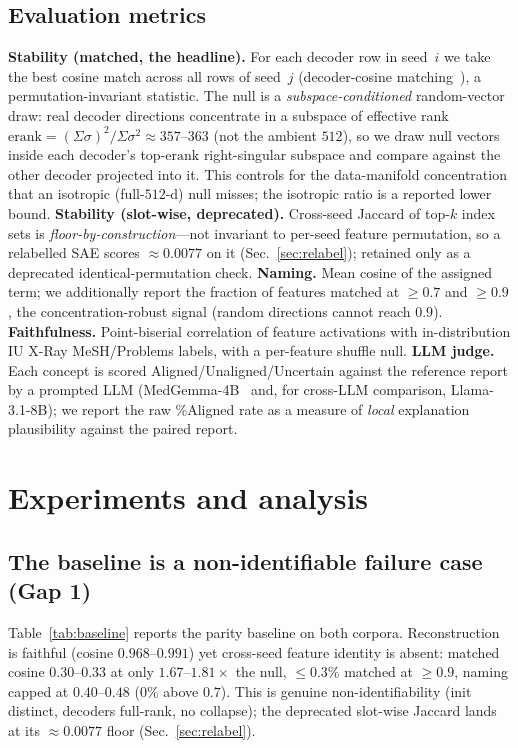 \documentclass[sigconf, nonacm]{acmart}
\begin{document}
\subsection{Evaluation metrics}
\textbf{Stability (matched, the headline).} For each decoder row in seed~$i$ we take the best cosine match across all rows of seed~$j$ (decoder-cosine matching~\cite{bricken2023monosemanticity,lan2024universality}), a permutation-invariant statistic. The null is a \emph{subspace-conditioned} random-vector draw: real decoder directions concentrate in a subspace of effective rank $\mathrm{erank}{=}(\Sigma\sigma)^2/\Sigma\sigma^2{\approx}357$--$363$ (not the ambient $512$), so we draw null vectors inside each decoder's top-$\mathrm{erank}$ right-singular subspace and compare against the other decoder projected into it. This controls for the data-manifold concentration that an isotropic (full-$512$-d) null misses; the isotropic ratio is a reported lower bound.
\textbf{Stability (slot-wise, deprecated).} Cross-seed Jaccard of top-$k$ index sets is \emph{floor-by-construction}---not invariant to per-seed feature permutation, so a relabelled SAE scores ${\approx}0.0077$ on it (Sec.~\ref{sec:relabel}); retained only as a deprecated identical-permutation check.
\textbf{Naming.} Mean cosine of the assigned term; we additionally report the fraction of features matched at $\geq0.7$ and $\geq0.9$, the concentration-robust signal (random directions cannot reach $0.9$).
\textbf{Faithfulness.} Point-biserial correlation of feature activations with in-distribution IU X-Ray MeSH/Problems labels, with a per-feature shuffle null. \textbf{LLM judge.} Each concept is scored Aligned/Unaligned/Uncertain against the reference report by a prompted LLM (MedGemma-4B~\cite{sellergren2025medgemma} and, for cross-LLM comparison, Llama-3.1-8B); we report the raw \%Aligned rate as a measure of \emph{local} explanation plausibility against the paired report.

\section{Experiments and analysis}

\subsection{The baseline is a non-identifiable failure case (Gap 1)}
Table~\ref{tab:baseline} reports the parity baseline on both corpora. Reconstruction is faithful (cosine $0.968$--$0.991$) yet cross-seed feature identity is absent: matched cosine $0.30$--$0.33$ at only $1.67$--$1.81{\times}$ the null, ${\leq}0.3\%$ matched at $\geq0.9$, naming capped at $0.40$--$0.48$ ($0\%$ above $0.7$). This is genuine non-identifiability (init distinct, decoders full-rank, no collapse); the deprecated slot-wise Jaccard lands at its ${\approx}0.0077$ floor (Sec.~\ref{sec:relabel}).
\end{document}
